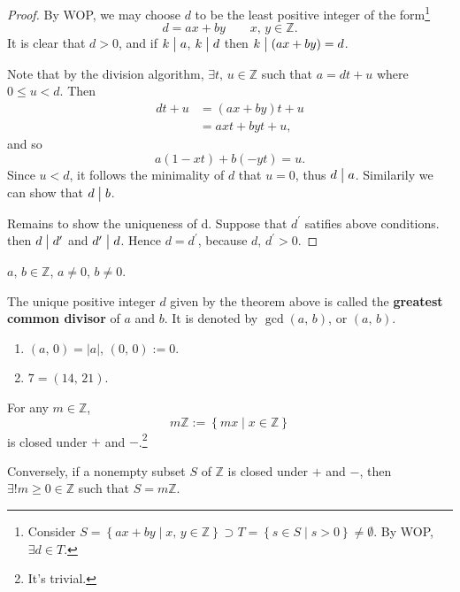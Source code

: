 \begin{proof}
    By WOP, we may choose $d$ to be the least positive integer of the form\footnote{
        Consider $S=\left\{ax+by \mid x,\,y\in\mathbb{Z}\right\}
        \supset T=\left\{s \in S \mid s > 0\right\} \neq \emptyset$. By WOP, $\exists d \in T$.
    }
    \[
        d=ax+by \qquad x,\,y\in\mathbb{Z}.
    \]
    It is clear that $d>0$, and if $k \bigm| a$, $k \bigm| d$
    then $k \bigm| \left(ax+by\right)=d$.

    Note that by the division algorithm,
    $\exists t,\,u\in\mathbb{Z}$ such that $a=dt+u$ where $0 \leq u < d$. Then
    \begin{align*}
        dt+u &= \left(ax+by\right)t + u\\
        &= axt + byt + u,
    \end{align*}
    and so
    \[
        a\left(1-xt\right)+b\left(-yt\right)=u.
    \]
    Since $u<d$, it follows the minimality of $d$ that $u=0$, thus $d \bigm| a$.
    Similarily we can show that $d \bigm| b$.

    Remains to show the uniqueness of d. Suppose that $d^\prime$ satifies above conditions.
    then $d \bigm| d^\prime$ and $d^\prime \bigm| d$. Hence $d=d^\prime$, because $d,\,d^\prime>0$.
\end{proof}

\begin{definition}
    $a,\,b \in \mathbb{Z}$, $a \neq 0$, $b \neq 0$.

    The unique positive integer $d$ given by the theorem above is called the \textbf{greatest common divisor}
    of $a$ and $b$. It is denoted by $\operatorname{\mathrm{gcd}}\left(a,\,b\right)$, or $\left(a,\,b\right)$.
\end{definition}

\begin{remark}
    \begin{enumerate}
        \item $\left(a,\,0\right)=\left|a\right|$, $\left(0,\,0\right):=0$.
        \item $7=\left(14,\,21\right)$.
    \end{enumerate}
\end{remark}

\begin{theorem}
    For any $m \in \mathbb{Z}$,
    \[
        m\mathbb{Z} := \left\{mx \mid x \in \mathbb{Z}\right\}
    \]
    is closed under $+$ and $-$.\footnote{It's trivial.}

    Conversely, if a nonempty subset $S$ of $\mathbb{Z}$ is closed under $+$ and $-$,
    then $\exists! m \geq 0 \in \mathbb{Z}$ such that $S = m\mathbb{Z}$.
\end{theorem}